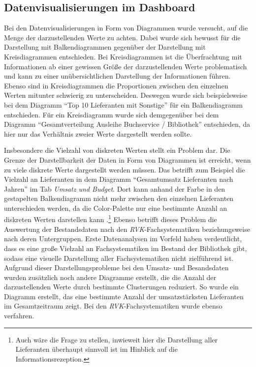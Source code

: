 \subsection{Datenvisualisierungen im Dashboard}
Bei den Datenvisualisierungen in Form von Diagrammen wurde versucht, auf die Menge der darzustellenden Werte zu achten. Dabei wurde
sich bewusst für die Darstellung mit Balkendiagrammen gegenüber der Darstellung mit Kreisdiagrammen entschieden. Bei Kreisdiagrammen
ist die Überfrachtung mit Informationen ab einer gewissen Größe der darzustellenden Werte problematisch und kann zu einer unübersichtlichen
Darstellung der Informationen führen. Ebenso sind in Kreisdiagrammen die Proportionen zwischen den einzelnen Werten mitunter schwierig zu unterscheiden.
Deswegen wurde sich beispielsweise bei dem Diagramm \enquote{Top 10 Lieferanten mit Sonstige} für ein Balkendiagramm entschieden. Für ein Kreisdiagramm
wurde sich demgegenüber bei dem Diagramm \enquote{Gesamtverteilung Ausleihe Buchservice / Bibliothek} entschieden, da hier nur das Verhältnis zweier Werte dargestellt werden sollte. 


Insbesondere die Vielzahl von diskreten Werten stellt ein Problem dar. 
Die Grenze der Darstellbarkeit der Daten in Form von Diagrammen ist erreicht, wenn zu viele diskrete Werte dargestellt werden müssen.
Das betrifft zum Beispiel die Vielzahl an Lieferanten in dem Diagramm \enquote{Gesamtumsatz Lieferanten nach Jahren} im Tab \textit{Umsatz und Budget}. 
Dort kann anhand der Farbe in den gestapelten Balkendiagramm nicht mehr zwischen den einzelnen Lieferanten unterschieden werden, da die Color-Palette 
nur eine bestimmte Anzahl an diskreten Werten darstellen kann \cite[vgl.][]{plotly_discrete_2021}.\footnote{  Auch wäre die Frage zu stellen, inwieweit hier die Darstellung aller Lieferanten 
überhaupt sinnvoll ist im Hinblick auf die Informationsrezeption.}
Ebenso betrifft dieses Problem die Auswertung der Bestandsdaten nach den \textit{\acrshort{RVK}}-Fachsystematiken beziehungsweise nach deren Untergruppen. 
Erste Datenanalysen im Vorfeld haben verdeutlicht, dass es eine große Vielzahl an Fachsystematiken im Bestand der Bibliothek gibt, sodass eine visuelle Darstellung aller Fachsystematiken nicht zielführend ist.
Aufgrund dieser Darstellungsprobleme bei den Umsatz- und Besandsdaten wurden zusätzlich noch andere Diagramme erstellt, die die Anzahl der darzustellenden Werte durch bestimmte Clusterungen reduziert.
So wurde ein Diagramm erstellt, das eine bestimmte Anzahl der umsatzstärksten Lieferanten im Gesamtzeitraum zeigt. Bei den \textit{\acrshort{RVK}}-Fachsystematiken wurde ebenso
verfahren.




